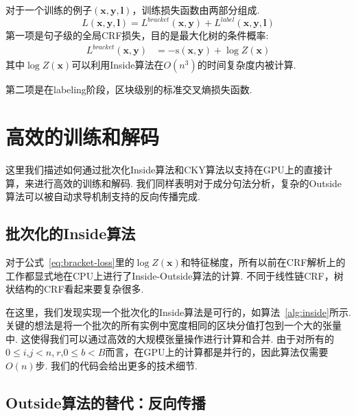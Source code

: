 对于一个训练的例子$(\boldsymbol{x},\boldsymbol{y},\boldsymbol{l})$，训练损失函数由两部分组成.
\begin{equation} \label{eq:final-loss}
  \mathit{L}(\boldsymbol{x}, \boldsymbol{y}, \boldsymbol{l}) = \mathit{L}^{bracket}(\boldsymbol{x}, \boldsymbol{y}) + \mathit{L}^{label}(\boldsymbol{x}, \boldsymbol{y}, \boldsymbol{l})
\end{equation}
第一项是句子级的全局CRF损失，目的是最大化树的条件概率:
\begin{equation}\label{eq:bracket-loss}
  \begin{split}
    \mathit{L}^{bracket}(\boldsymbol{x},\boldsymbol{y})
    &= -\mathrm{s}(\boldsymbol{x}, \boldsymbol{y}) + \log Z(\boldsymbol{x})
  \end{split}
\end{equation}
其中$\log Z(\boldsymbol{x})$可以利用Inside算法在$O(n^3)$的时间复杂度内被计算.

第二项是在labeling阶段，区块级别的标准交叉熵损失函数.

\section{高效的训练和解码}
\label{sec:efficient-training-decoding}



这里我们描述如何通过批次化Inside算法和CKY算法以支持在GPU上的直接计算，来进行高效的训练和解码.
我们同样表明对于成分句法分析，复杂的Outside算法可以被自动求导机制支持的反向传播完成.

\subsection{批次化的Inside算法}

对于公式~\ref{eq:bracket-loss}里的$\log Z(\boldsymbol{x})$和特征梯度，所有以前在CRF解析上的工作\citep{finkel-etal-2008-efficient,durrett-klein-2015-neural}都显式地在CPU上进行了Inside-Outside算法的计算.
不同于线性链CRF，树状结构的CRF看起来要复杂很多.

在这里，我们发现实现一个批次化的Inside算法是可行的，如算法~\ref{alg:inside}所示.
关键的想法是将一个批次的所有实例中宽度相同的区块分值打包到一个大的张量中.
这使得我们可以通过高效的大规模张量操作进行计算和合并.
由于对所有的$0 \le i$,$j<n$,$~r$,$0\le b<B$而言，在GPU上的计算都是并行的，因此算法仅需要$O(n)$步.
我们的代码会给出更多的技术细节.

\subsection{Outside算法的替代：反向传播}

